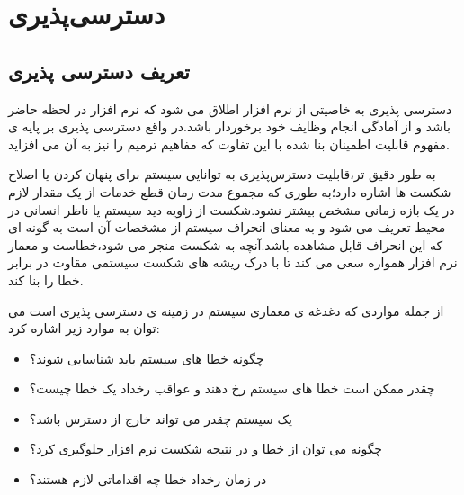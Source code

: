 \chapter{دسترسی‌پذیری}
\section{تعریف دسترسی پذیری}
دسترسی پذیری به خاصیتی از نرم افزار اطلاق می شود که نرم افزار در لحظه حاضر باشد و از آمادگی انجام وظایف خود برخوردار باشد.در واقع دسترسی پذیری بر پایه ی مفهوم قابلیت اطمینان بنا شده با این تفاوت که مفاهیم ترمیم  را نیز به آن می افزاید.

به طور دقیق تر،‌قابلیت دسترس‌پذیری به توانایی سیستم برای پنهان کردن یا اصلاح شکست ها اشاره دارد؛‌به طوری که مجموع مدت زمان قطع خدمات از یک مقدار لازم در یک بازه زمانی مشخص بیشتر نشود.شکست از زاویه دید سیستم یا ناظر انسانی در محیط تعریف می شود و به معنای انحراف سیستم از مشخصات آن است به گونه ای که این انحراف قابل مشاهده باشد.آنچه به شکست منجر می شود،خطاست و معمار نرم افزار همواره سعی می کند تا با درک ریشه های شکست سیستمی مقاوت در برابر خطا را بنا کند.

از جمله مواردی که دغدغه ی معماری سیستم در زمینه ی دسترسی پذیری است می توان به موارد زیر اشاره کرد:
\begin{itemize}
\item
چگونه خطا های سیستم باید شناسایی شوند؟
\item
چقدر ممکن است خطا های سیستم رخ دهند و عواقب رخداد یک خطا چیست؟
\item
یک سیستم چقدر می تواند خارج از دسترس باشد؟
\item
چگونه می توان از خطا و در نتیجه شکست نرم افزار جلوگیری کرد؟
\item
در زمان رخداد خطا چه اقداماتی لازم هستند؟
\end{itemize}